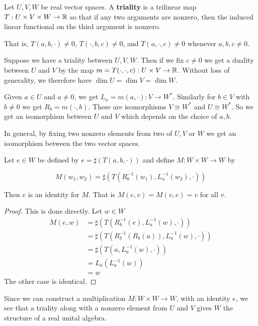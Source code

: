 \begin{defn}[Triality]
    Let $U,V,W$ be real vector spaces. A \textbf{triality} is a trilinear map $T : U\times V\times W \to \operatorname{\mathbb{R}}$ so that if any two arguments are nonzero, then the induced linear functional on the third argument is nonzero.

    That is, $T(a,b,\cdot)\neq 0$, $T(\cdot,b,c)\neq 0$, and $T(a,\cdot,c)\neq 0$ whenever $a,b,c\neq 0$.
\end{defn}
\begin{remark*}
    Suppose we have a triality between $U,V,W$. Then if we fix $c\neq 0$ we get a duality between $U$ and $V$ by the map $m = T(\cdot,\cdot,c) : U\times V \to \operatorname{\mathbb{R}}$. Without loss of generality, we therefore have $\dim U = \dim V = \dim W$.
\end{remark*}
\begin{remark*}
    Given $a\in U$ and $a\neq 0$, we get $L_a = m(a,\cdot) : V\to W^*$. Similarly for $b\in V$ with $b\neq 0$ we get $R_b = m(\cdot,b)$. These are isomorphisms $V\cong W^*$ and $U\cong W^*$. So we get an isomorphism between $U$ and $V$ which depends on the choice of $a,b$.

    In general, by fixing two nonzero elements from two of $U,V$ or $W$ we get an isomorphism between the two vector spaces.
\end{remark*}
\begin{lemma}
    Let $e\in W$ be defined by $e = \sharp( T(a,b,\cdot))$ and define $M : W\times W \to W$ by 
    
    \[M(w_1,w_2) = \sharp( T(R_b^{-1}(w_1),L_a^{-1}(w_2),\cdot))\]

    Then $e$ is an identity for $M$. That is $M(e,v) = M(v,e) = v$ for all $v$.
\end{lemma}
\begin{proof}
This is done directly. Let $w\in W$
    \begin{align*}
        M(e,w) &= \sharp(T(R_b^{-1}(e),L_a^{-1}(w),\cdot))\\
        &= \sharp(T(R_b^{-1}(R_b(a)),L_a^{-1}(w),\cdot))\\
        &= \sharp(T(a,L_a^{-1}(w),\cdot))\\
        &= L_a(L_a^{-1}(w))\\
        &= w
    \end{align*}
    The other case is identical.
\end{proof}
\begin{remark*}
    Since we can construct a multiplication $M : W\times W\to W$, with an identity $e$, we see that a triality along with a nonzero element from $U$ and $V$ gives $W$ the structure of a real unital algebra.
\end{remark*}
